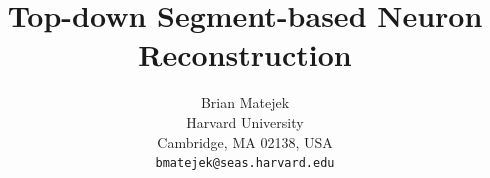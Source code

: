 \documentclass[10pt,twocolumn,letterpaper]{article}
\begin{document}
\title{Top-down Segment-based Neuron Reconstruction}


\author{Brian Matejek\\
Harvard University\\
Cambridge, MA 02138, USA\\
{\tt\small bmatejek@seas.harvard.edu}
}

\maketitle
\end{document}
